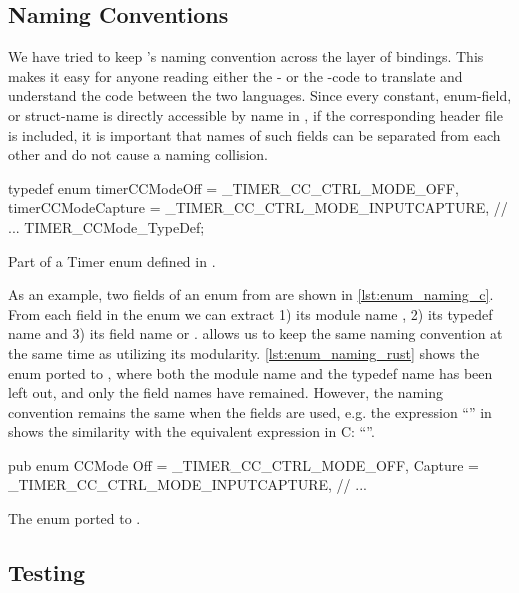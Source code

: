 \subsection{Naming Conventions}

We have tried to keep \emlib's naming convention across the layer of bindings.
This makes it easy for anyone reading either the {\C}- or the {\rust}-code to translate and understand the code between the two languages.
Since every constant, enum-field, or struct-name is directly accessible by name in {\C}, if the corresponding header file is included, it is important that names of such fields can be separated from each other and do not cause a naming collision.

\begin{listing}[h]
\begin{ccode}
typedef enum {
  timerCCModeOff     = _TIMER_CC_CTRL_MODE_OFF,
  timerCCModeCapture = _TIMER_CC_CTRL_MODE_INPUTCAPTURE,
  // ...
} TIMER_CCMode_TypeDef;
\end{ccode}
\caption{Part of a Timer enum defined in {\C}.}
\label{lst:enum_naming_c}
\end{listing}

As an example, two fields of an enum from  are shown in \autoref{lst:enum_naming_c}.
From each field in the enum we can extract 1) its module name , 2) its typedef name  and 3) its field name  or .
{\rust} allows us to keep the same naming convention at the same time as utilizing its modularity.
\autoref{lst:enum_naming_rust} shows the enum ported to {\rust}, where both the module name and the typedef name has been left out, and only the field names have remained.
However, the naming convention remains the same when the fields are used, e.g. the expression ``'' in {\rust} shows the similarity with the equivalent expression in C: ``''.

\begin{listing}[h]
\begin{rustcode}
pub enum CCMode {
  Off     = _TIMER_CC_CTRL_MODE_OFF,
  Capture = _TIMER_CC_CTRL_MODE_INPUTCAPTURE,
  // ...
}
\end{rustcode}
\caption{The enum ported to {\rust}.}
\label{lst:enum_naming_rust}
\end{listing}

\subsection{Testing}
\label{ssub:testing}

